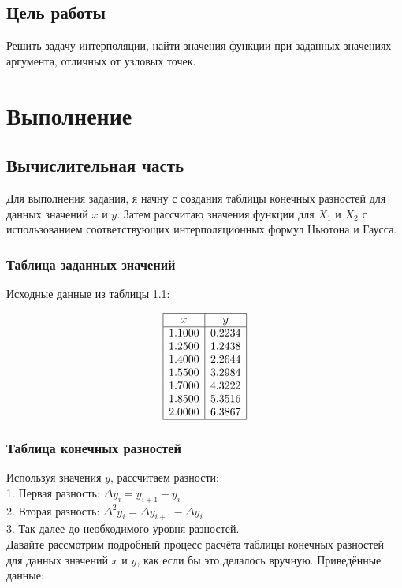\documentclass{article}
\begin{document}
\subsection{Цель работы}
      Решить задачу интерполяции, найти значения функции при заданных значениях аргумента, отличных от узловых точек.



\section{Выполнение}
      
      \subsection{Вычислительная часть}

      Для выполнения задания, я начну с создания таблицы конечных разностей для данных значений \( x \) и \( y \). Затем рассчитаю значения функции для \( X_1 \) и \( X_2 \) с использованием соответствующих интерполяционных формул Ньютона и Гаусса.

            \subsubsection{Таблица заданных значений}
                  Исходные данные из таблицы 1.1:

                  \[
                  \begin{array}{|c|c|}
                  \hline
                  x & y \\
                  \hline
                  1.1000 & 0.2234 \\
                  1.2500 & 1.2438 \\
                  1.4000 & 2.2644 \\
                  1.5500 & 3.2984 \\
                  1.7000 & 4.3222 \\
                  1.8500 & 5.3516 \\
                  2.0000 & 6.3867 \\
                  \hline
                  \end{array}
                  \]

            \subsubsection{Таблица конечных разностей}
                  Используя значения \( y \), рассчитаем разности:
                  \\
                  1. Первая разность: \(\Delta y_i = y_{i+1} - y_i\) \\
                  2. Вторая разность: \(\Delta^2 y_i = \Delta y_{i+1} - \Delta y_i\) \\
                  3. Так далее до необходимого уровня разностей.
                  \\
                  Давайте рассмотрим подробный процесс расчёта таблицы конечных разностей для данных значений \(x\) и \(y\), как если бы это делалось вручную. Приведённые данные:
\end{document}
